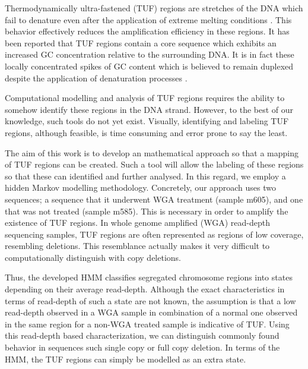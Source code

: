 \documentclass[12pt]{article}
\begin{document}
Thermodynamically ultra-fastened (TUF) regions are stretches of the DNA which fail to denature
even after the application of extreme melting conditions \cite{veal2012}. 
This behavior effectively reduces the amplification efficiency in these regions. It has been reported that TUF regions contain a core sequence which exhibits an increased GC concentration relative to the surrounding DNA. It is in fact these locally concentrated spikes of GC content which is believed to remain duplexed despite the application of denaturation processes \cite{veal2012}. 

Computational modelling and analysis of TUF regions requires the ability to somehow identify these regions in the 
DNA strand. However, to the best of our knowledge, such tools do not yet exist. Visually, identifying and
labeling TUF regions, although feasible, is time consuming and error prone to say the least. 

The aim of this work  is to develop an mathematical approach so that a mapping of TUF regions can be created. Such a tool will allow the labeling of these regions so that these can identified and further analysed.  In this regard, we employ a hidden Markov modelling methodology. Concretely, our approach uses two sequences; a sequence that it underwent WGA treatment (sample  m605), and  one that was not treated (sample m585). This is necessary in order to amplify the existence of TUF regions. In whole genome amplified (WGA) read-depth sequencing samples, TUF regions are often represented as regions of low coverage, resembling deletions. This resemblance actually makes it very difficult to computationally distinguish with copy deletions.


Thus,  the developed HMM classifies segregated chromosome regions into states depending on their average read-depth. 
Although the exact characteristics in terms of read-depth of such a state are not known, the assumption is that a low read-depth observed in a WGA sample in combination 
of a normal one observed in the same region for a non-WGA treated sample is indicative of TUF. Using this read-depth based characterization, we can distinguish commonly found behavior in sequences such single copy or full copy deletion. In terms of the HMM, the TUF regions can simply be modelled as an extra state. 
\end{document}
